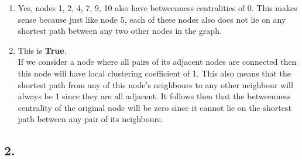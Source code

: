 \documentclass{article}
\begin{document}
\begin{enumerate}[label=(\alph*), left=10pt, itemsep=10pt]
\begin{minipage}[t]{0.9\textwidth}
            \end{minipage}
        
        \item \begin{minipage}[t]{0.9\textwidth}
                Yes, nodes 1, 2, 4, 7, 9, 10 also have betweenness centralities of 0. This makes sense
                because just like node 5, each of these nodes also does not lie on any shortest path
                between any two other nodes in the graph.
            \end{minipage}
        
        \item \begin{minipage}[t]{0.9\textwidth}
                This is \textbf{True}.\\
                If we consider a node where all pairs of its adjacent nodes are connected then this node
                will have local clustering coefficient of 1. This also means that the shortest path
                from any of this node's neighbours to any other neighbour will always be 1 since they are all
                adjacent. It follows then that the betweenness centrality of the original node
                will be zero since it cannot lie on the shortest path between any pair of its neighbours. 
            \end{minipage}

    \end{enumerate}

    \newpage

    \subsection*{2.}    
    
\end{document}
